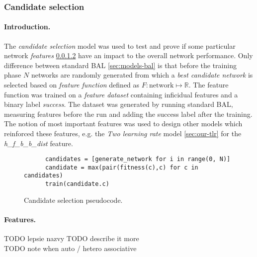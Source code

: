 \subsubsection{Candidate selection} 
\label{sec:sim-exp-candidates}

\paragraph{Introduction.} 
The \emph{candidate selection} model was used to test and prove if some particular network \emph{features} \ref{sec:our-candidates-features} have an impact to the overall network performance. Only difference between standard BAL \ref{sec:models-bal} is that before the training phase $N$ networks are randomly generated from which a \emph{best candidate network} is selected based on \emph{feature function} defined as $F: \mbox{network} \mapsto \mathbb{R}$. The feature function was trained on a \emph{feature dataset} containing inficidual features and a binary label \emph{success}. The dataset was generated by running standard BAL, measuring features before the run and adding the success label after the training. The notion of most important features was used to design other models which reinforced these features, e.g. the \emph{Two learning rate} model \ref{sec:our-tlr} for the \emph{h\_f\_b\_b\_dist} feature. 

\begin{figure}[H]
    \begin{lstlisting} 
      candidates = [generate_network for i in range(0, N)] 
      candidate = max(pair(fitness(c),c) for c in candidates) 
      train(candidate.c) 
    \end{lstlisting} 
  \caption{Candidate selection pseudocode.}
  \label{fig:our-candidates-pseudocode} 
\end{figure} 

\paragraph{Features.}
\label{sec:our-candidates-features}

TODO lepsie nazvy 
TODO describe it more \\
TODO note when auto / hetero associative \\

